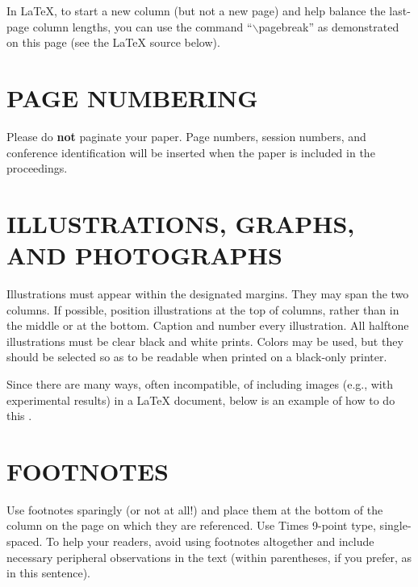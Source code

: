 \documentclass{article}
\begin{document}
In LaTeX, to start a new column (but not a new page) and help balance the
last-page column lengths, you can use the command ``$\backslash$pagebreak'' as
demonstrated on this page (see the LaTeX source below).

\section{PAGE NUMBERING}
\label{sec:page}

Please do {\bf not} paginate your paper.  Page numbers, session numbers, and
conference identification will be inserted when the paper is included in the
proceedings.

\section{ILLUSTRATIONS, GRAPHS, AND PHOTOGRAPHS}
\label{sec:illust}

Illustrations must appear within the designated margins.  They may span the two
columns.  If possible, position illustrations at the top of columns, rather
than in the middle or at the bottom.  Caption and number every illustration.
All halftone illustrations must be clear black and white prints.  Colors may be
used, but they should be selected so as to be readable when printed on a
black-only printer.

Since there are many ways, often incompatible, of including images (e.g., with
experimental results) in a LaTeX document, below is an example of how to do
this \cite{Lamp86}.

\section{FOOTNOTES}
\label{sec:foot}

Use footnotes sparingly (or not at all!) and place them at the bottom of the
column on the page on which they are referenced. Use Times 9-point type,
single-spaced. To help your readers, avoid using footnotes altogether and
include necessary peripheral observations in the text (within parentheses, if
you prefer, as in this sentence).
\end{document}
